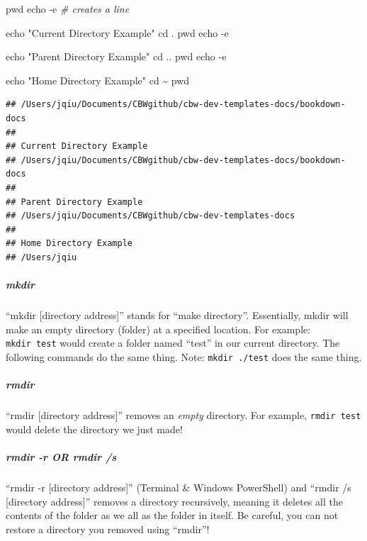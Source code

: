 \documentclass[
]{book}
\newenvironment{Shaded}{\begin{snugshade}}{\end{snugshade}}
\newcommand{\AttributeTok}[1]{\textcolor[rgb]{0.13,0.29,0.53}{#1}}
\newcommand{\BuiltInTok}[1]{#1}
\newcommand{\CommentTok}[1]{\textcolor[rgb]{0.56,0.35,0.01}{\textit{#1}}}
\newcommand{\NormalTok}[1]{#1}
\newcommand{\StringTok}[1]{\textcolor[rgb]{0.31,0.60,0.02}{#1}}
\theoremstyle{definition}
\theoremstyle{definition}
\theoremstyle{definition}
\theoremstyle{definition}
\theoremstyle{remark}
\begin{document}
\begin{Shaded}
\begin{Highlighting}[]
\BuiltInTok{pwd}
\BuiltInTok{echo} \AttributeTok{{-}e} \CommentTok{\# creates a line}

\BuiltInTok{echo} \StringTok{"Current Directory Example"}
\BuiltInTok{cd}\NormalTok{ .}
\BuiltInTok{pwd}
\BuiltInTok{echo} \AttributeTok{{-}e}

\BuiltInTok{echo} \StringTok{"Parent Directory Example"}
\BuiltInTok{cd}\NormalTok{ ..}
\BuiltInTok{pwd}
\BuiltInTok{echo} \AttributeTok{{-}e}

\BuiltInTok{echo} \StringTok{"Home Directory Example"}
\BuiltInTok{cd}\NormalTok{ \textasciitilde{}}
\BuiltInTok{pwd}
\end{Highlighting}
\end{Shaded}

\begin{verbatim}
## /Users/jqiu/Documents/CBWgithub/cbw-dev-templates-docs/bookdown-docs
## 
## Current Directory Example
## /Users/jqiu/Documents/CBWgithub/cbw-dev-templates-docs/bookdown-docs
## 
## Parent Directory Example
## /Users/jqiu/Documents/CBWgithub/cbw-dev-templates-docs
## 
## Home Directory Example
## /Users/jqiu
\end{verbatim}

\subparagraph*{mkdir}\label{mkdir}

``mkdir {[}directory address{]}'' stands for ``make directory''. Essentially, mkdir will make an empty directory (folder) at a specified location. For example: \texttt{mkdir\ test} would create a folder named ``test'' in our current directory. The following commands do the same thing. Note: \texttt{mkdir\ ./test} does the same thing.

\subparagraph*{rmdir}\label{rmdir}

``rmdir {[}directory address{]}'' removes an \emph{empty} directory. For example, \texttt{rmdir\ test} would delete the directory we just made!

\subparagraph*{rmdir -r OR rmdir /s}\label{rmdir--r-or-rmdir-s}

``rmdir -r {[}directory address{]}'' (Terminal \& Windows PowerShell) and ``rmdir /s {[}directory address{]}'' removes a directory recursively, meaning it deletes all the contents of the folder as we all as the folder in itself. Be careful, you can not restore a directory you removed using ``rmdir''!
\end{document}
